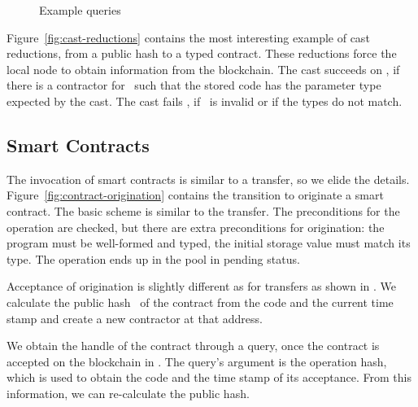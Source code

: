 \documentclass[a4paper]{llncs}
\begin{document}
\begin{figure}[tp]
  \begin{mathpar}

  \end{mathpar}
  \caption{Example queries}
  \label{fig:example-queries}
\end{figure}


Figure~\ref{fig:cast-reductions} contains the most interesting
example of cast reductions, from a public hash to a typed
contract. These reductions force the local node to obtain information
from the blockchain. The cast succeeds  on \PUH, if there is a
contractor for \PUH\ such that the stored code has the parameter type
expected by the cast. The cast fails , if \PUH\
is invalid or if the types do not match.




\subsection{Smart Contracts}
\label{sec:smart-contracts}

The invocation of smart contracts is similar to a transfer, so we
elide the details. Figure~\ref{fig:contract-origination} contains the
transition \TirName{Block-Originate} to originate a smart contract. The basic scheme is similar
to the transfer. The preconditions for the operation are checked, but
there are extra preconditions for origination:  the program must be
well-formed and typed, the initial storage value must match its
type. The operation ends up in the pool in pending status.

Acceptance of origination is slightly different as for transfers as
shown in \TirName{Block-Accept}. We calculate the public hash \PUH\ of the
contract from the code and the current time stamp and create a new
contractor at that address.  

We obtain the handle of the contract through a query, once the
contract is accepted on the blockchain in
. The query's argument is the operation
hash, which is used to obtain the code and the time stamp of its
acceptance. From this information, we can re-calculate the public
hash. 
\end{document}
